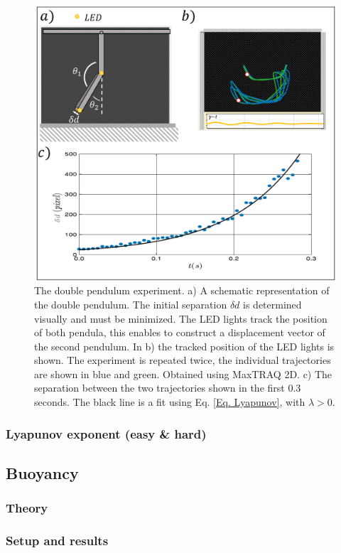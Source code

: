 \documentclass{article}
\begin{document}
\begin{figure}[H]
    \centering
    \includegraphics[width = 12cm]{figures/Lyapunov.pdf}
    \caption{The double pendulum experiment. a) A schematic representation of the double pendulum. The initial separation $\delta d$ is determined visually and must be minimized. The LED lights track the position of both pendula, this enables to construct a displacement vector of the second pendulum. In b) the tracked position of the LED lights is shown. The experiment is repeated twice, the individual trajectories are shown in blue and green. Obtained using MaxTRAQ 2D. c) The separation between the two trajectories shown in the first 0.3 seconds. The black line is a fit using Eq. \ref{Eq. Lyapunov}, with $\lambda > 0$. }
    \label{Fig. Lyapunov}
\end{figure}
\subsubsection{Lyapunov exponent (easy \& hard)}


\newpage

\subsection{Buoyancy}
\subsubsection{Theory}
\subsubsection{Setup and results}
\end{document}
